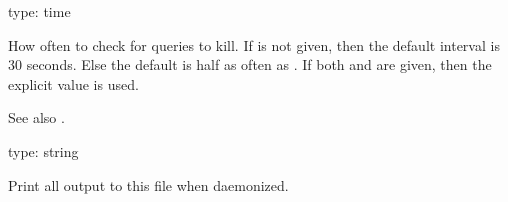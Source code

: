\documentclass[letterpaper,10pt,english]{sphinxmanual}
\begin{document}
\begin{fulllineitems}
\label{\detokenize{mariadb-kill:cmdoption-mariadb-kill-interval}}
type: time

How often to check for queries to kill.  If {\hyperref[\detokenize{mariadb-kill:cmdoption-mariadb-kill-busy-time}]{}} is not given,
then the default interval is 30 seconds.  Else the default is half as often
as {\hyperref[\detokenize{mariadb-kill:cmdoption-mariadb-kill-busy-time}]{}}.  If both {\hyperref[\detokenize{mariadb-kill:cmdoption-mariadb-kill-interval}]{}} and {\hyperref[\detokenize{mariadb-kill:cmdoption-mariadb-kill-busy-time}]{}} are given,
then the explicit {\hyperref[\detokenize{mariadb-kill:cmdoption-mariadb-kill-interval}]{}} value is used.

See also {\hyperref[\detokenize{mariadb-kill:cmdoption-mariadb-kill-run-time}]{}}.

\end{fulllineitems}


\begin{fulllineitems}
\label{\detokenize{mariadb-kill:cmdoption-mariadb-kill-log}}
type: string

Print all output to this file when daemonized.

\end{fulllineitems}
\end{document}
